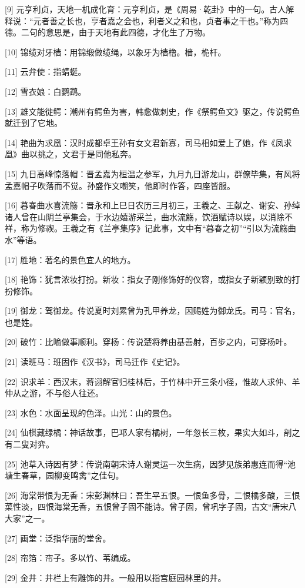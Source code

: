\documentclass[12pt,UTF8]{ctexbook}
\begin{document}
[9] 元亨利贞，天地一机成化育：元亨利贞，是《周易·乾卦》中的一句。古人解释说：“元者善之长也，亨者嘉之会也，利者义之和也，贞者事之干也。”称为四德。二句的意思是，由于天地有此四德，才化生了万物。

[10] 锦缆对牙樯：用锦缎做缆绳，以象牙为樯橹。樯，桅杆。

[11] 云弁使：指蜻蜓。

[12] 雪衣娘：白鹦鹉。

[13] 雄文能徙鳄：潮州有鳄鱼为害，韩愈做刺史，作《祭鳄鱼文》驱之，传说鳄鱼就迁到了它地。

[14] 艳曲为求凰：汉时成都卓王孙有女文君新寡，司马相如爱上了她，作《凤求凰》曲以挑之，文君于是同他私奔。

[15] 九日高峰惊落帽：晋孟嘉为桓温之参军，九月九日游龙山，群僚毕集，有风将孟嘉帽子吹落而不觉。孙盛作文嘲笑，他即时作答，四座皆服。

[16] 暮春曲水喜流觞：晋永和上巳日农历三月初三，王羲之、王献之、谢安、孙绰诸人曾在山阴兰亭集会，于水边嬉游采兰，曲水流觞，饮酒赋诗以娱，以消除不祥，称为修禊。王羲之有《兰亭集序》记此事，文中有“暮春之初”“引以为流觞曲水”等语。

[17] 胜地：著名的景色宜人的地方。

[18] 艳饰：犹言浓妆打扮。新妆：指女子刚修饰好的仪容，或指女子新颖别致的打扮修饰。

[19] 御龙：驾御龙。传说夏时刘累曾为孔甲养龙，因赐姓为御龙氏。司马：官名，也是姓。

[20] 破竹：比喻做事顺利。穿杨：传说楚将养由基善射，百步之内，可穿杨叶。

[21] 读班马：班固作《汉书》，司马迁作《史记》。

[22] 识求羊：西汉末，蒋诩解官归桂林后，于竹林中开三条小径，惟故人求仲、羊仲从之游，不与俗人往还。

[23] 水色：水面呈现的色泽。山光：山的景色。

[24] 仙棋藏绿橘：神话故事，巴邛人家有橘树，一年忽长三枚，果实大如斗，剖之有二叟对弈。

[25] 池草入诗因有梦：传说南朝宋诗人谢灵运一次生病，因梦见族弟惠连而得“池塘生春草，园柳变鸣禽”之佳句。

[26] 海棠带恨为无香：宋彭渊林曰：吾生平五恨。一恨鱼多骨，二恨橘多酸，三恨菜性淡，四恨海棠无香，五恨曾子固不能诗。曾子固，曾巩字子固，古文“唐宋八大家”之一。

[27] 画堂：泛指华丽的堂舍。

[28] 帘箔：帘子。多以竹、苇编成。

[29] 金井：井栏上有雕饰的井。一般用以指宫庭园林里的井。
\end{document}
